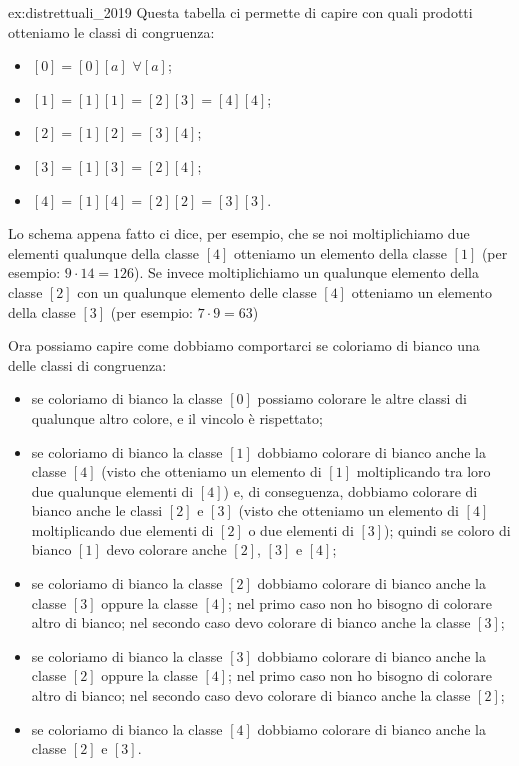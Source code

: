 \begin{soluzione}{ex:distrettuali_2019}
    Questa tabella ci permette di capire con quali prodotti otteniamo le classi di congruenza:
    \begin{itemize}
        \item $[0] = [0][a] \,\,\forall [a]$;
        \item $[1] = [1][1] = [2][3] = [4][4]$;
        \item $[2] = [1][2] = [3][4]$;
        \item $[3] = [1][3] = [2][4]$;
        \item $[4] = [1][4] = [2][2] = [3][3]$.
    \end{itemize}

    Lo schema appena fatto ci dice, per esempio, che se noi moltiplichiamo due elementi qualunque della classe $[4]$
    otteniamo un elemento della classe $[1]$ (per esempio: $9 \cdot 14 = 126$).
    Se invece moltiplichiamo un qualunque elemento della classe $[2]$ con un qualunque elemento delle classe $[4]$
    otteniamo un elemento della classe $[3]$ (per esempio: $7 \cdot 9 = 63$)

    Ora possiamo capire come dobbiamo comportarci se coloriamo di bianco una delle classi di congruenza:
    \begin{itemize}
        \item se coloriamo di bianco la classe $[0]$ possiamo colorare le altre classi di qualunque altro colore,
        e il vincolo è rispettato;
        \item se coloriamo di bianco la classe $[1]$ dobbiamo colorare di bianco anche la classe $[4]$ (visto che otteniamo un
        elemento di $[1]$ moltiplicando tra loro due qualunque elementi di $[4]$) e, di conseguenza, dobbiamo colorare
        di bianco anche le classi $[2]$ e $[3]$ (visto che otteniamo un elemento di $[4]$ moltiplicando due elementi di
        $[2]$ o due elementi di $[3]$); quindi se coloro di bianco $[1]$ devo colorare anche $[2]$, $[3]$ e $[4]$;
        \item se coloriamo di bianco la classe $[2]$ dobbiamo colorare di bianco anche la classe $[3]$ oppure la classe
        $[4]$; nel primo caso non ho bisogno di colorare altro di bianco;
        nel secondo caso devo colorare di bianco anche la classe $[3]$;
        \item se coloriamo di bianco la classe $[3]$ dobbiamo colorare di bianco anche la classe $[2]$ oppure la classe
        $[4]$; nel primo caso non ho bisogno di colorare altro di bianco;
        nel secondo caso devo colorare di bianco anche la classe $[2]$;
        \item se coloriamo di bianco la classe $[4]$ dobbiamo colorare di bianco anche la classe $[2]$ e $[3]$.
    \end{itemize}


\end{soluzione}
